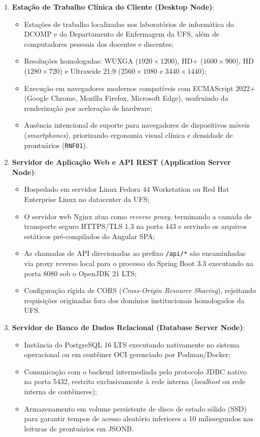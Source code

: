 \begin{enumerate}
    \item \textbf{Estação de Trabalho Clínica do Cliente (Desktop Node)}:
    \begin{itemize}
        \item Estações de trabalho localizadas nos laboratórios de informática do DCOMP e do Departamento de Enfermagem da UFS, além de computadores pessoais dos docentes e discentes;
        \item Resoluções homologadas: WUXGA ($1920 \times 1200$), HD+ ($1600 \times 900$), HD ($1280 \times 720$) e Ultrawide 21:9 ($2560 \times 1080$ e $3440 \times 1440$);
        \item Execução em navegadores modernos compatíveis com ECMAScript 2022+ (Google Chrome, Mozilla Firefox, Microsoft Edge), usufruindo da renderização por aceleração de hardware;
        \item Ausência intencional de suporte para navegadores de dispositivos móveis (\textit{smartphones}), priorizando ergonomia visual clínica e densidade de prontuários (\texttt{RNF01}).
    \end{itemize}

    \item \textbf{Servidor de Aplicação Web e API REST (Application Server Node)}:
    \begin{itemize}
        \item Hospedado em servidor Linux Fedora 44 Workstation ou Red Hat Enterprise Linux no datacenter da UFS;
        \item O servidor web Nginx atua como \textit{reverse proxy}, terminando a camada de transporte seguro HTTPS/TLS 1.3 na porta 443 e servindo os arquivos estáticos pré-compilados do Angular SPA;
        \item As chamadas de API direcionadas ao prefixo \texttt{/api/*} são encaminhadas via proxy reverso local para o processo do Spring Boot 3.3 executando na porta 8080 sob o OpenJDK 21 LTS;
        \item Configuração rígida de CORS (\textit{Cross-Origin Resource Sharing}), rejeitando requisições originadas fora dos domínios institucionais homologados da UFS.
    \end{itemize}

    \item \textbf{Servidor de Banco de Dados Relacional (Database Server Node)}:
    \begin{itemize}
        \item Instância do PostgreSQL 16 LTS executando nativamente no sistema operacional ou em contêiner OCI gerenciado por Podman/Docker;
        \item Comunicação com o backend intermediada pelo protocolo JDBC nativo na porta 5432, restrita exclusivamente à rede interna (\textit{localhost} ou rede interna de contêineres);
        \item Armazenamento em volume persistente de disco de estado sólido (SSD) para garantir tempos de acesso aleatório inferiores a 10 milissegundos nas leituras de prontuários em JSONB.
    \end{itemize}
\end{enumerate}

